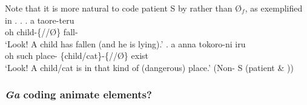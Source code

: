 Note that
it is more natural to code   patient S by  rather than {\O$_{f}$}, as exemplified in \Next.
%
\ex. \label{ExAnimateS}
	\ag. a  taore-teru \\
		oh child-\{//{\O}\} fall- \\
		`Look! A child has fallen (and he is lying).'
	\bg. a anna tokoro-ni  iru \\
		oh such place- \{child/cat\}-\{//{\O}\} exist \\
		`Look! A child/cat is in that kind of (dangerous) place.' \hfill{(Non- S (patient \& ))}


\subsubsection{\textit{Ga} coding animate elements?}\label{Par:CasePar:Ga:GaAnim}

